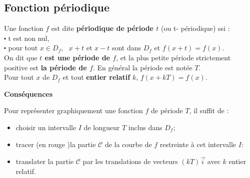 \subsection{Fonction périodique}
\begin{definition}
 Une fonction $ f $ est dite
\textbf{\color{magenta} périodique de période $ t $} (ou t- périodique) ssi :\\
 $ \centerdot $ t est non nul, \\
$ \centerdot $  pour tout $x\in D_{f} $, \   $  x+t$ et $ x-t$   sont dans $ D_{f} $           et  $f(x+t)=f(x) $.\\
On dit que \textbf{\color{magenta} $t$ est une période de $f$}, et la plus petite période strictement positive est  \textbf{\color{magenta} la période de $f$}.  En général la période est notée $ T $. \\
Pour tout $x$ de $ D_{f} $ et tout \textbf{\color{magenta} entier relatif } $ k $, \colorbox{gray!20!}{$ f(x+kT) = f(x) $. }
\end{definition}

\textbf{\color{blue}Conséquences}

Pour représenter graphiquement une fonction $ f $ de période $ T $, il suffit de :
\begin{itemize}
\item choisir un intervalle $ I $ de longueur $ T $ inclus dans $ D_{f} $;
\item tracer (en rouge )la partie $ \mathcal{C} $ de la courbe de $ f $ restreinte à cet intervalle $ I: $
\item translater la partie $ \mathcal{C} $ par les translations de vecteurs $ (kT)\overrightarrow{i} $ avec $ k $ entier relatif.
\end{itemize}

